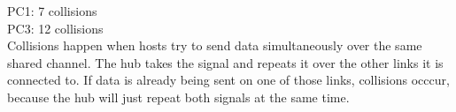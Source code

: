 PC1: 7 collisions \\
PC3: 12 collisions \\

Collisions happen when hosts try to send data simultaneously over the same shared channel.
The hub takes the signal and repeats it over the other links it is connected to.
If data is already being sent on one of those links, collisions occcur, because the hub will
just repeat both signals at the same time.

